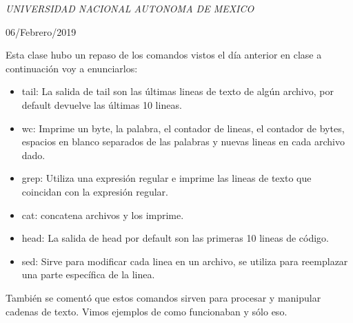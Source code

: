 \documentclass[a4paper, 11pt, oneside]{article}
\begin{document}
\begin{titlepage}
	\textit{UNIVERSIDAD NACIONAL AUTONOMA DE MEXICO} 
	
	\vfill
	
	
	
	
	\vspace{0.3\baselineskip} 
	
	06/Febrero/2019 
	
	 

\end{titlepage}
Esta clase hubo un repaso de los comandos vistos el día anterior en clase a continuación voy a enunciarlos:
\begin{itemize}
 \item tail: La salida de tail son las últimas lineas de texto de algún archivo, por default devuelve las últimas 10 lineas.
 \item wc: Imprime un byte, la palabra, el contador de lineas, el contador de bytes, espacios en blanco separados de las palabras y nuevas lineas en cada archivo dado.
 \item grep: Utiliza una expresión regular e imprime las lineas de texto que coincidan con la expresión regular.
 \item cat: concatena archivos y los imprime.
 \item head: La salida de head por default son las primeras 10 lineas de código.
 \item sed: Sirve para modificar cada linea en un archivo, se utiliza para reemplazar una parte específica de la linea.
\end{itemize}

También se comentó que estos comandos sirven para procesar y              manipular cadenas de texto. Vimos ejemplos de como funcionaban y sólo eso.
\end{document}
